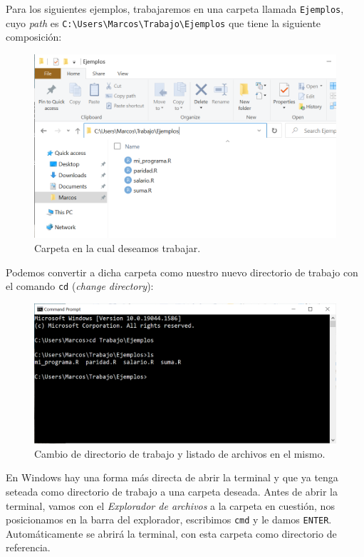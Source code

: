 \documentclass[
]{book}
\begin{document}
Para los siguientes ejemplos, trabajaremos en una carpeta llamada \texttt{Ejemplos}, cuyo \emph{path} es \texttt{C:\textbackslash{}Users\textbackslash{}Marcos\textbackslash{}Trabajo\textbackslash{}Ejemplos} que tiene la siguiente composición:

\begin{figure}

{\centering \includegraphics[width=0.8\linewidth]{images/07_otros/terminal4} 

}

\caption{Carpeta en la cual deseamos trabajar.}\label{fig:unnamed-chunk-109}
\end{figure}

Podemos convertir a dicha carpeta como nuestro nuevo directorio de trabajo con el comando \texttt{cd} (\emph{change directory}):

\begin{figure}

{\centering \includegraphics[width=0.8\linewidth]{images/07_otros/terminal5} 

}

\caption{Cambio de directorio de trabajo y listado de archivos en el mismo.}\label{fig:unnamed-chunk-110}
\end{figure}

En Windows hay una forma más directa de abrir la terminal y que ya tenga seteada como directorio de trabajo a una carpeta deseada. Antes de abrir la terminal, vamos con el \emph{Explorador de archivos} a la carpeta en cuestión, nos posicionamos en la barra del explorador, escribimos \texttt{cmd} y le damos \texttt{ENTER}. Automáticamente se abrirá la terminal, con esta carpeta como directorio de referencia.
\end{document}
